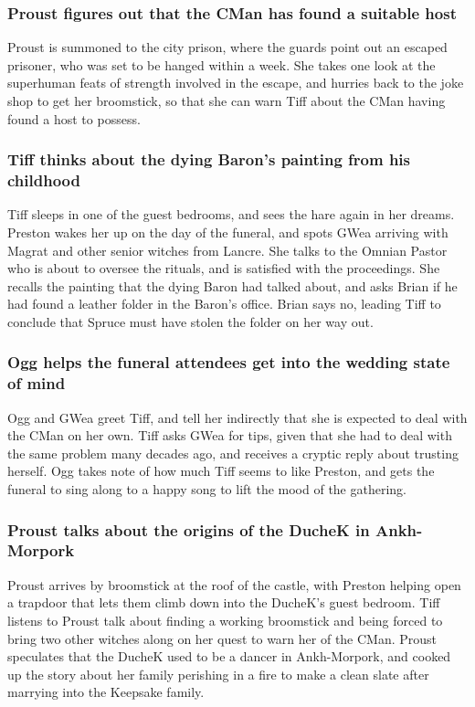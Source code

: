 \subsubsection{\Gls{Proust} figures out that the \Gls{CMan} has found a suitable host}
\Gls{Proust} is summoned to the city prison, where the guards point out an escaped prisoner, who
was set to be hanged within a week. She takes one look at the superhuman feats of strength involved
in the escape, and hurries back to the joke shop to get her broomstick, so that she can warn
\Gls{Tiff} about the \Gls{CMan} having found a host to possess.

\subsubsection{\Gls{Tiff} thinks about the dying \Gls{Baron}'s painting from his childhood}
\Gls{Tiff} sleeps in one of the guest bedrooms, and sees the hare again in her dreams. \Gls{Preston}
wakes her up on the day of the funeral, and spots \Gls{GWea} arriving with \Gls{Magrat} and other
senior witches from Lancre. She talks to the Omnian Pastor who is about to oversee the rituals, and
is satisfied with the proceedings. She recalls the painting that the dying \Gls{Baron} had talked
about, and asks \Gls{Brian} if he had found a leather folder in the \Gls{Baron}'s office.
\Gls{Brian} says no, leading \Gls{Tiff} to conclude that \Gls{Spruce} must have stolen the folder on
her way out.

\subsubsection{\Gls{Ogg} helps the funeral attendees get into the wedding state of mind}
\Gls{Ogg} and \Gls{GWea} greet \Gls{Tiff}, and tell her indirectly that she is expected to deal with
the \Gls{CMan} on her own. \Gls{Tiff} asks \Gls{GWea} for tips, given that she had to deal with
the same problem many decades ago, and receives a cryptic reply about trusting herself. \Gls{Ogg}
takes note of how much \Gls{Tiff} seems to like \Gls{Preston}, and gets the funeral to sing along
to a happy song to lift the mood of the gathering.

\subsubsection{\Gls{Proust} talks about the origins of the \Gls{DucheK} in Ankh-Morpork}
\Gls{Proust} arrives by broomstick at the roof of the castle, with \Gls{Preston} helping open a
trapdoor that lets them climb down into the \Gls{DucheK}'s guest bedroom. \Gls{Tiff} listens to
\Gls{Proust} talk about finding a working broomstick and being forced to bring two other witches
along on her quest to warn her of the \Gls{CMan}. \Gls{Proust} speculates that the \Gls{DucheK} used
to be a dancer in Ankh-Morpork, and cooked up the story about her family perishing in a fire to
make a clean slate after marrying into the Keepsake family.

